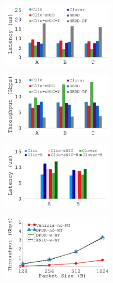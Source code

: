 {
\begin{figure}[t]
\begin{center}
\centerline{\includegraphics[width=0.5\textwidth]{snic/Figures/g_plot_ycsb.pdf}}
{
}
\end{center}
\end{figure}
}
{
\begin{figure}[h]
\begin{center}
\centerline{\includegraphics[width=0.5\textwidth]{snic/Figures/g_plot_ycsb_throughput.pdf}}
{
}
\end{center}
\end{figure}
}
{
\begin{figure}[h]
\begin{center}
\centerline{\includegraphics[width=0.5\textwidth]{snic/Figures/g_plot_ycsb_replication.pdf}}
{
}
\end{center}
\end{figure}
}
{
\begin{figure}[h]
\begin{center}
\centerline{\includegraphics[width=0.5\textwidth]{snic/Figures/g_plot_ovs.pdf}}
{
}
\end{center}
\end{figure}
}
